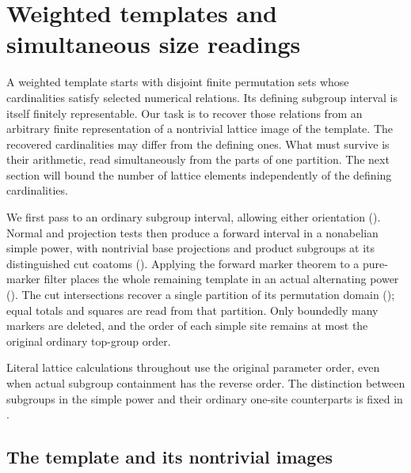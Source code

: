 \section{Weighted templates and simultaneous size readings}\label{sec:weighted}
A weighted template starts with disjoint finite permutation sets whose
cardinalities satisfy selected numerical relations.  Its defining subgroup
interval is itself finitely representable.  Our task is to recover those
relations from an arbitrary finite representation of a nontrivial lattice
image of the template.  The recovered cardinalities may differ from the
defining ones.  What must survive is their arithmetic, read simultaneously
from the parts of one partition.  The next section will bound the number
of lattice elements independently of the defining cardinalities.

We first pass to an ordinary subgroup interval, allowing either
orientation ().  Normal and projection tests then
produce a forward interval in a nonabelian simple power, with nontrivial
base projections and product subgroups at its distinguished cut coatoms
().  Applying the forward marker theorem
to a pure-marker filter places the whole remaining template in an actual
alternating power ().  The cut intersections
recover a single partition of its permutation domain
(); equal totals and squares are read from
that partition.  Only boundedly many markers are deleted, and the order
of each simple site remains at most the original ordinary top-group order.

Literal lattice calculations throughout use the original parameter order,
even when actual subgroup containment has the reverse order.  The
distinction between subgroups in the simple power and their ordinary
one-site counterparts is fixed in
.

\subsection{The template and its nontrivial images}


